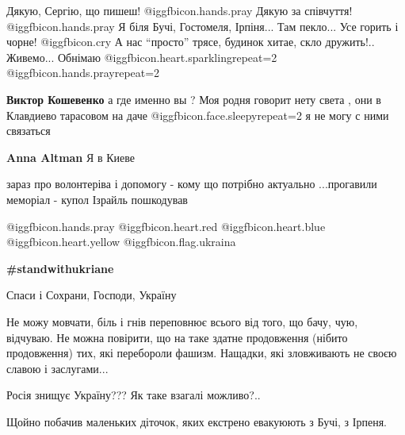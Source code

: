  
 
 
 
 
\zzSecCmt

\begin{itemize} %

Дякую, Сергію, що пишеш!  @igg{fbicon.hands.pray}  Дякую за співчуття!  @igg{fbicon.hands.pray}  Я біля Бучі, Гостомеля,
Ірпіня... Там пекло... Усе горить і чорне!  @igg{fbicon.cry} А нас \enquote{просто} трясе, будинок
хитае, скло дружить!.. Живемо... Обнімаю  @igg{fbicon.heart.sparkling}{repeat=2}  @igg{fbicon.hands.pray}{repeat=2} 

\begin{itemize} %
\textbf{Виктор Кошевенко} а где именно вы ? Моя родня говорит нету света , они в Клавдиево тарасовом на даче  @igg{fbicon.face.sleepy}{repeat=2}  я не могу с ними связаться

\textbf{Anna Altman} Я в Киеве
\end{itemize} %


зараз про волонтеріва і допомогу - кому що потрібно актуально ...прогавили
меморіал - купол Ізрайль пошкодував


@igg{fbicon.hands.pray} @igg{fbicon.heart.red} @igg{fbicon.heart.blue}
@igg{fbicon.heart.yellow} @igg{fbicon.flag.ukraina}

\textbf{\#standwithukriane}

Спаси і Сохрани, Господи, Україну


Не можу мовчати, біль і гнів переповнює всього від того, що бачу, чую,
відчуваю. Не можна повірити, що на таке здатне продовження (нібито продовження)
тих, які перебороли фашизм. Нащадки, які зловживають не своєю славою і
заслугами...

Росія знищує Україну??? Як таке взагалі можливо?..

Щойно побачив маленьких діточок, яких екстрено евакуюють з Бучі, з Ірпеня.


\end{itemize}

